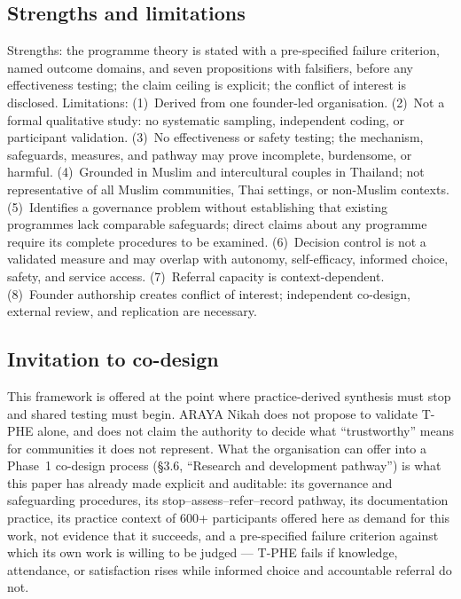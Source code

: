 \documentclass[10pt,twocolumn]{article}
\newcommand{\tphe}{T\mbox{-}PHE}
\begin{document}
\subsection{Strengths and limitations}
Strengths: the programme theory is stated with a pre-specified failure criterion, named outcome domains, and seven propositions with falsifiers, before any effectiveness testing; the claim ceiling is explicit; the conflict of interest is disclosed. Limitations: (1)~Derived from one founder-led organisation. (2)~Not a formal qualitative study: no systematic sampling, independent coding, or participant validation. (3)~No effectiveness or safety testing; the mechanism, safeguards, measures, and pathway may prove incomplete, burdensome, or harmful. (4)~Grounded in Muslim and intercultural couples in Thailand; not representative of all Muslim communities, Thai settings, or non-Muslim contexts. (5)~Identifies a governance problem without establishing that existing programmes lack comparable safeguards; direct claims about any programme require its complete procedures to be examined. (6)~Decision control is not a validated measure and may overlap with autonomy, self-efficacy, informed choice, safety, and service access. (7)~Referral capacity is context-dependent. (8)~Founder authorship creates conflict of interest; independent co-design, external review, and replication are necessary.

\subsection{Invitation to co-design}
This framework is offered at the point where practice-derived synthesis must stop and shared testing must begin. ARAYA Nikah does not propose to validate \tphe{} alone, and does not claim the authority to decide what ``trustworthy'' means for communities it does not represent. What the organisation can offer into a Phase~1 co-design process (\S3.6, ``Research and development pathway'') is what this paper has already made explicit and auditable: its governance and safeguarding procedures, its stop--assess--refer--record pathway, its documentation practice, its practice context of 600+ participants offered here as demand for this work, not evidence that it succeeds, and a pre-specified failure criterion against which its own work is willing to be judged --- \tphe{} fails if knowledge, attendance, or satisfaction rises while informed choice and accountable referral do not.
\end{document}
